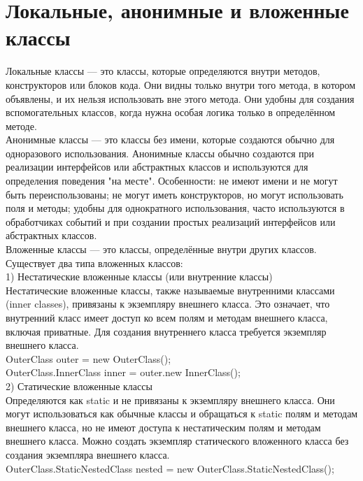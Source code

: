 \section{Локальные, анонимные и вложенные классы}
Локальные классы — это классы, которые определяются внутри методов, конструкторов или блоков кода. Они видны только внутри того метода, в котором объявлены, и их нельзя использовать вне этого метода. Они удобны для создания вспомогательных классов, когда нужна особая логика только в определённом методе. \\
Анонимные классы — это классы без имени, которые создаются обычно для одноразового использования. Анонимные классы обычно создаются при реализации интерфейсов или абстрактных классов и используются для определения поведения "на месте". Особенности: не имеют имени и не могут быть переиспользованы; не могут иметь конструкторов, но могут использовать поля и методы; удобны для однократного использования, часто используются в обработчиках событий и при создании простых реализаций интерфейсов или абстрактных классов. \\
Вложенные классы — это классы, определённые внутри других классов. Существует два типа вложенных классов: \\
1) Нестатические вложенные классы (или внутренние классы) \\
Нестатические вложенные классы, также называемые внутренними классами (inner classes), привязаны к экземпляру внешнего класса. Это означает, что внутренний класс имеет доступ ко всем полям и методам внешнего класса, включая приватные. Для создания внутреннего класса требуется экземпляр внешнего класса. \\
OuterClass outer = new OuterClass(); \\
OuterClass.InnerClass inner = outer.new InnerClass(); \\
2) Статические вложенные классы  \\
Определяются как static и не привязаны к экземпляру внешнего класса. Они могут использоваться как обычные классы и обращаться к static полям и методам внешнего класса, но не имеют доступа к нестатическим полям и методам внешнего класса. Можно создать экземпляр статического вложенного класса без создания экземпляра внешнего класса. \\
OuterClass.StaticNestedClass nested = new OuterClass.StaticNestedClass();
